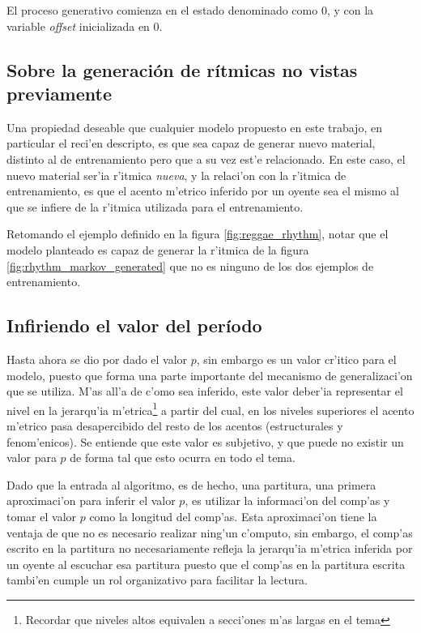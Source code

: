 El proceso generativo comienza en el estado denominado como $0$, y con la variable \emph{offset} inicializada en $0$.

\subsection{Sobre la generaci\'on de r\'itmicas no vistas previamente}
Una propiedad deseable que cualquier modelo propuesto en este trabajo, en particular el reci'en descripto, es que sea capaz de generar nuevo material, distinto al de entrenamiento
pero que a su vez est'e relacionado. En este caso, el nuevo material ser'ia r'itmica \emph{nueva}, y la relaci'on con la r'itmica de entrenamiento, es que el acento m'etrico inferido por un oyente 
sea el mismo al que se infiere de la r'itmica utilizada para el entrenamiento. 

Retomando el ejemplo definido en la figura \ref{fig:reggae_rhythm}, notar que el modelo planteado es capaz de generar la r'itmica de la figura \ref{fig:rhythm_markov_generated}
que no es ninguno de los dos ejemplos de entrenamiento.

\begin{imagen}
\end{imagen}


\subsection{Infiriendo el valor del per\'iodo}
Hasta ahora se dio por dado el valor $p$, sin embargo es un valor cr'itico para el modelo, puesto que forma una parte importante del mecanismo de 
generalizaci'on que se utiliza. 
M'as all'a de c'omo sea inferido, este valor deber'ia representar el nivel en la jerarqu'ia m'etrica\footnote{Recordar que niveles altos equivalen a secci'ones m'as largas en el tema} a partir 
del cual, en los niveles superiores el acento m'etrico pasa desapercibido del resto de los acentos (estructurales y fenom'enicos). 
Se entiende que este valor es subjetivo, y que puede no existir un valor para $p$ de forma tal que esto ocurra en todo el tema.

Dado que la entrada al algoritmo, es de hecho, una partitura, una primera aproximaci'on para inferir el valor $p$, es utilizar la informaci'on del 
comp'as y tomar el valor $p$ como la longitud del comp'as. 
Esta aproximaci'on tiene la ventaja de que no es necesario realizar ning'un c'omputo, sin embargo, el comp'as escrito en la partitura no necesariamente refleja la jerarqu'ia
m'etrica inferida por un oyente al escuchar esa partitura puesto que el comp'as en la partitura escrita tambi'en cumple un rol organizativo para facilitar la lectura. 

